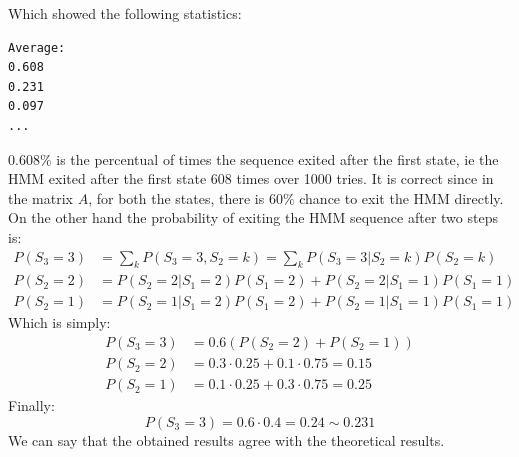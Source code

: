 \documentclass[10pt,a4paper,final]{article}
\begin{document}
Which showed the following statistics:
\begin{lstlisting}
Average: 
0.608
0.231
0.097
...
\end{lstlisting}
$0.608\%$ is the percentual of times the sequence exited after the first state, ie the HMM exited after the first state 608 times over 1000 tries. It is correct since in the matrix $A$, for both the states, there is $60\%$ chance to exit the HMM directly. 
On the other hand the probability of exiting the HMM sequence after two steps is:
\begin{align*}
P(S_3=3)&=\sum_k P(S_3=3,S_{2}=k)=\sum_k P(S_3=3|S_{2}=k)P(S_{2}=k) \\
P(S_2=2)&=P(S_2=2|S_1=2)P(S_1=2)+P(S_2=2|S_1=1)P(S_1=1)\\
P(S_2=1)&=P(S_2=1|S_1=2)P(S_1=2)+P(S_2=1|S_1=1)P(S_1=1)
\end{align*}
Which is simply:
\begin{align*}
P(S_3=3)&=0.6(P(S_2=2)+P(S_2=1))\\
P(S_2=2)&=0.3\cdot 0.25+0.1\cdot 0.75=0.15\\
P(S_2=1)&=0.1\cdot 0.25+0.3\cdot 0.75=0.25
\end{align*}
Finally:
$$P(S_3=3)=0.6\cdot 0.4=0.24 \sim 0.231$$
We can say that the obtained results agree with the theoretical results.
\end{document}
